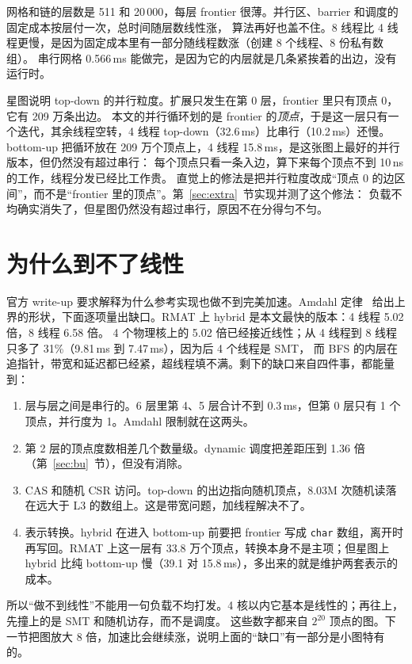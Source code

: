 \documentclass[11pt,a4paper]{ctexart}
\begin{document}
网格和链的层数是 511 和 20\,000，每层 frontier 很薄。并行区、barrier 和调度的固定成本按层付一次，总时间随层数线性涨，
算法再好也盖不住。8 线程比 4 线程更慢，是因为固定成本里有一部分随线程数涨（创建 8 个线程、8 份私有数组）。
串行网格 0.566\,ms 能做完，是因为它的内层就是几条紧挨着的出边，没有运行时。

星图说明 top-down 的并行粒度。扩展只发生在第 0 层，frontier 里只有顶点 0，它有 209 万条出边。
本文的并行循环划的是 frontier 的\emph{顶点}，于是这一层只有一个迭代，其余线程空转，4 线程 top-down（32.6\,ms）比串行（10.2\,ms）还慢。
bottom-up 把循环放在 209 万个顶点上，4 线程 15.8\,ms，是这张图上最好的并行版本，但仍然没有超过串行：
每个顶点只看一条入边，算下来每个顶点不到 10\,ns 的工作，线程分发已经比工作贵。
直觉上的修法是把并行粒度改成``顶点 0 的边区间''，而不是``frontier 里的顶点''。第~\ref{sec:extra}~节实现并测了这个修法：
负载不均确实消失了，但星图仍然没有超过串行，原因不在分得匀不匀。

\section{为什么到不了线性}
\label{sec:why}

官方 write-up 要求解释为什么参考实现也做不到完美加速。Amdahl 定律~\cite{amdahl} 给出上界的形状，下面逐项量出缺口。RMAT 上 hybrid 是本文最快的版本：4 线程 5.02 倍，8 线程 6.58 倍。
4 个物理核上的 5.02 倍已经接近线性；从 4 线程到 8 线程只多了 31\%（9.81\,ms 到 7.47\,ms），因为后 4 个线程是 SMT，
而 BFS 的内层在追指针，带宽和延迟都已经紧，超线程填不满。剩下的缺口来自四件事，都能量到：

\begin{enumerate}
\item 层与层之间是串行的。6 层里第 4、5 层合计不到 0.3\,ms，但第 0 层只有 1 个顶点，并行度为 1。Amdahl 限制就在这两头。
\item 第 2 层的顶点度数相差几个数量级。dynamic 调度把差距压到 1.36 倍（第~\ref{sec:bu}~节），但没有消除。
\item CAS 和随机 CSR 访问。top-down 的出边指向随机顶点，8.03M 次随机读落在远大于 L3 的数组上。这是带宽问题，加线程解决不了。
\item 表示转换。hybrid 在进入 bottom-up 前要把 frontier 写成 \texttt{char} 数组，离开时再写回。RMAT 上这一层有 33.8 万个顶点，转换本身不是主项；但星图上 hybrid 比纯 bottom-up 慢（39.1 对 15.8\,ms），多出来的就是维护两套表示的成本。
\end{enumerate}

所以``做不到线性''不能用一句负载不均打发。4 核以内它基本是线性的；再往上，先撞上的是 SMT 和随机访存，而不是调度。
这些数字都来自 $2^{20}$ 顶点的图。下一节把图放大 8 倍，加速比会继续涨，说明上面的``缺口''有一部分是小图特有的。
\end{document}
